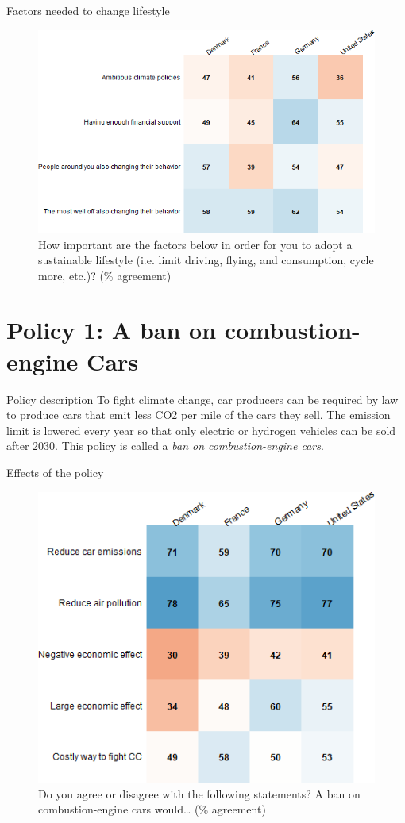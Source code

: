 \documentclass[aspectratio=169,9pt,dvipsnames]{beamer}
\begin{document}
\begin{frame}{Factors needed to change lifestyle}%
\begin{figure}[h!]
\centering
\caption{How important are the factors below in order for you to adopt a sustainable lifestyle (i.e. limit driving, flying, and consumption, cycle more, etc.)? (\% agreement)}
\includegraphics[width=.6\textwidth]{../figures/country_comparison/condition_positive_countries.png}
\end{figure}
\end{frame}



\section{Policy 1: A ban on combustion-engine Cars}

\begin{frame}{Policy description}%
To fight climate change, car producers can be required by law to produce cars that emit less CO2 per mile of the cars they sell. The emission limit is lowered every year so that only electric or hydrogen vehicles can be sold after 2030. This policy is called a \textit{ban on combustion-engine cars}. 
\end{frame}

\begin{frame}{Effects of the policy}%

\begin{figure}[h!]
\centering
\caption{Do you agree or disagree with the following statements? A ban on combustion-engine cars would… (\% agreement)}
\includegraphics[width=.45\textwidth]{../figures/country_comparison/standard_effect_positive_countries.png}
\end{figure}
\end{frame}
\end{document}
